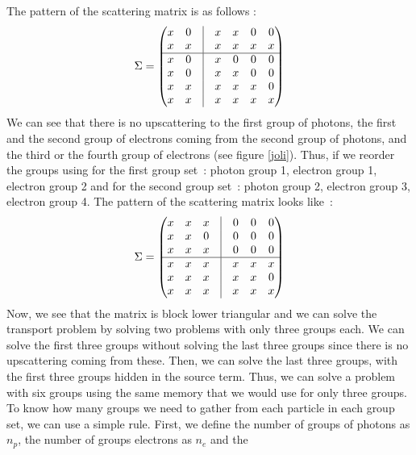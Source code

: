 The pattern of the scattering matrix is as follows :
\begin{equation}
\Sigma =
\begin{pmatrix}
x & 0 & \vline & x & x & 0 & 0\\
x & x & \vline & x & x & x & x\\
\hline     
x & 0 & \vline & x & 0 & 0 & 0\\
x & 0 & \vline & x & x & 0 & 0\\
x & x & \vline & x & x & x & 0\\
x & x & \vline & x & x & x & x\\
\end{pmatrix}
\end{equation}
We can see that there is no upscattering to the first group of photons, the
first and the second group of electrons coming from the second group of
photons, and the third or the fourth group of electrons (see figure
\ref{joli}). Thus, if we reorder the groups using for the first group \hbox{set :} 
photon group 1, electron group 1, electron group 2 and for the second group 
\hbox{set :} photon group 2, electron group 3, electron group 4. The pattern 
of the scattering matrix looks \hbox{like :}
\begin{equation}
\Sigma =
\begin{pmatrix}
x & x & x & \vline & 0 & 0 & 0\\
x & x & 0 & \vline & 0 & 0 & 0\\
x & x & x & \vline & 0 & 0 & 0\\
\hline      
x & x & x & \vline & x & x & x\\
x & x & x & \vline & x & x & 0\\
x & x & x & \vline & x & x & x\\
\end{pmatrix}
\end{equation}
Now, we see that the matrix is block lower triangular and we can solve the
transport problem by solving two problems with only three groups each. 
We can solve the first three groups without solving the last three groups since 
there is no upscattering coming from these. Then, we can solve the last three 
groups, with the first three groups hidden in the source term. Thus, we can 
solve a problem with six groups using the same memory that we would use for 
only three groups. To know how many groups we need to gather from each particle 
in each group set, we can use a simple rule. First, we define the number of 
groups of photons as $n_p$, the number of groups electrons as $n_e$ and the 
